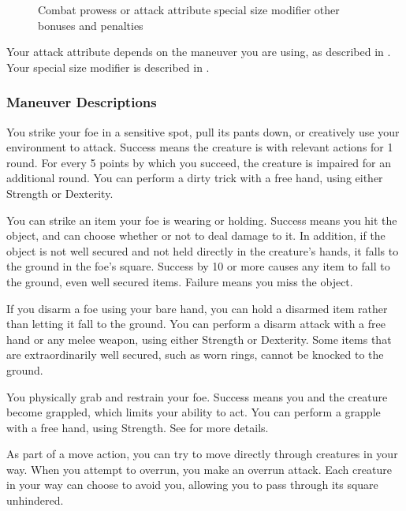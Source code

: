             \begin{figure}[h]
                \centering Combat prowess or attack attribute \add special size modifier \add other bonuses and penalties
            \end{figure}

            Your attack attribute depends on the maneuver you are using, as described in . Your special size modifier is described in .

        \subsubsection{Maneuver Descriptions}

            \label{Dirty Trick} You strike your foe in a sensitive spot, pull its pants down, or creatively use your environment to attack. Success means the creature is \impaired with relevant actions for 1 round. For every 5 points by which you succeed, the creature is impaired for an additional round. You can perform a dirty trick with a free hand, using either Strength or Dexterity.

            \label{Disarm} You can strike an item your foe is wearing or holding.
            Success means you hit the object, and can choose whether or not to deal damage to it.
            In addition, if the object is not well secured and not held directly in the creature's hands, it falls to the ground in the foe's square.
            Success by 10 or more causes any item to fall to the ground, even well secured items.
            Failure means you miss the object.

            If you disarm a foe using your bare hand, you can hold a disarmed item rather than letting it fall to the ground.
            You can perform a disarm attack with a free hand or any melee weapon, using either Strength or Dexterity.
            Some items that are extraordinarily well secured, such as worn rings, cannot be knocked to the ground.

            \label{Grapple} You physically grab and restrain your foe. Success means you and the creature become grappled, which limits your ability to act. You can perform a grapple with a free hand, using Strength. See  for more details.

            \label{Overrun}
            As part of a move action, you can try to move directly through creatures in your way.
            When you attempt to overrun, you make an overrun attack.
            Each creature in your way can choose to avoid you, allowing you to pass through its square unhindered.

